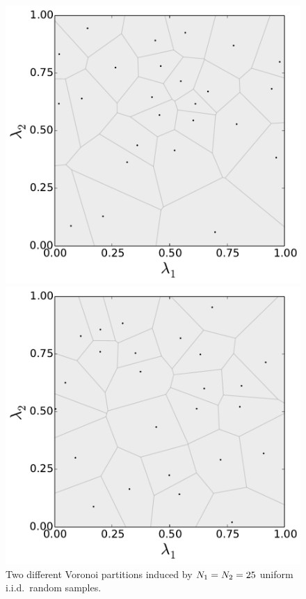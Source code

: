 \begin{figure}[ht]
\centering
	\begin{minipage}{.4875\textwidth}
		\includegraphics[width=\linewidth]{./images/voronoi_diagram_N25_r0}
	\end{minipage}
		\begin{minipage}{.4875\textwidth}
		\includegraphics[width=\linewidth]{./images/voronoi_diagram_N25_r10}
	\end{minipage}
\caption{
Two different Voronoi partitions induced by $N_1 = N_2 = 25 $ uniform i.i.d.~random samples.
}
\label{fig:voronoi_issues}
\end{figure}



